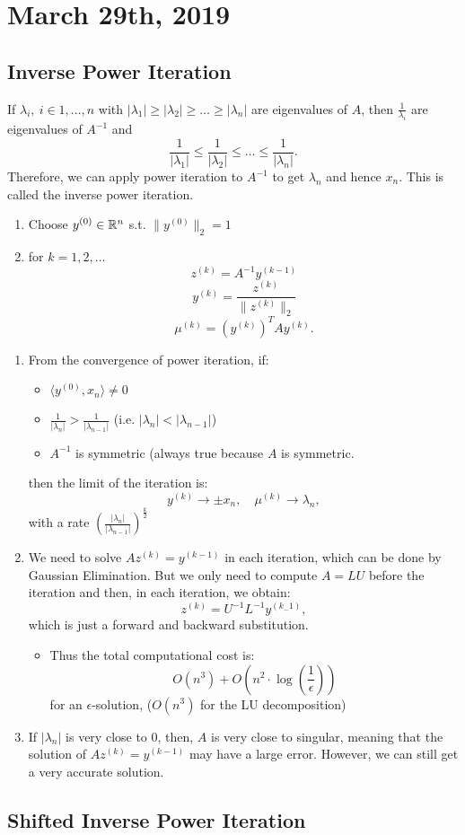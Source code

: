 \documentclass[../main/main.tex]{subfiles}
\begin{document}
\section{March 29th, 2019}
\subsection{Inverse Power Iteration}
If $\lambda_i,\ i\in 1,\ldots,n$ with $|\lambda_1|\ge |\lambda_2|\ge \ldots\ge |\lambda_n|$ are eigenvalues of $A$, then  $\frac{1}{\lambda_i}$ are eigenvalues of $A^{-1}$ and \[
\frac{1}{|\lambda_1|}\le \frac{1}{|\lambda_2|}\le \ldots\le \frac{1}{|\lambda_n|}
.\]  Therefore, we can apply power iteration to $A^{-1}$ to get $\lambda_n$ and hence $x_n$. This is called the inverse power iteration.
\begin{algo}
	\begin{enumerate}
		\item Choose $y^{(0)}\in \mathbb{R}^{n}$ s.t. $\|y^{(0)}\|_2=1$
		\item for $k=1,2,\ldots$
			\[
				z^{(k)}=A^{-1}y^{(k-1)}
			\]\[
			y^{(k)}=\frac{z^{(k)}}{\|z^{(k)}\|_2}
			\]\[
			\mu^{(k)}=\left( y^{(k)} \right)^{T}Ay^{(k)} 
			.\]  
	\end{enumerate}
\end{algo}
\begin{remark}
	\begin{enumerate}
		\item From the convergence of power iteration, if: 
			\begin{itemize}
				\item $\langle y^{(0)},x_n\rangle\neq 0$ 
				\item $\frac{1}{|\lambda_n|}>\frac{1}{|\lambda_{n-1}|}$ (i.e. $|\lambda_n|<|\lambda_{n-1}|$)
				\item $A^{-1}$ is symmetric (always true because $A$ is symmetric.
			\end{itemize}
			then the limit of the iteration is: \[
				y^{(k)}\to \pm x_n, \quad \mu^{(k)}\to \lambda_n
			,\] with a rate $\left( \frac{\left| \lambda_n \right|}{\left| \lambda_{n-1} \right|}  \right)^{\frac{k}{2}} $
\item We need to solve $Az^{(k)}=y^{(k-1)}$ in each iteration, which can be done by Gaussian Elimination. But we only need to compute $A=LU$ before the iteration and then, in each iteration, we obtain: \[
		z^{(k)}=U^{-1}L^{-1}y^{(k_-1)}
,\] which is just a forward and backward substitution. 
\begin{itemize}
	\item  Thus the total computational cost is: \[
			O(n^3)+O\left(n^2\cdot \log\left( \frac{1}{\epsilon} \right) \right)
		\] for an $\epsilon$-solution, ($O(n^3)$ for the LU decomposition)
\end{itemize}
\item If $|\lambda_n|$ is very close to 0, then, $A$ is very close to singular, meaning that the solution of $Az^{(k)}=y^{\left( k-1 \right) }$ may have a large error. However, we can still get a very accurate solution.
\end{enumerate}
\end{remark}
\subsection{Shifted Inverse Power Iteration}
\end{document}
